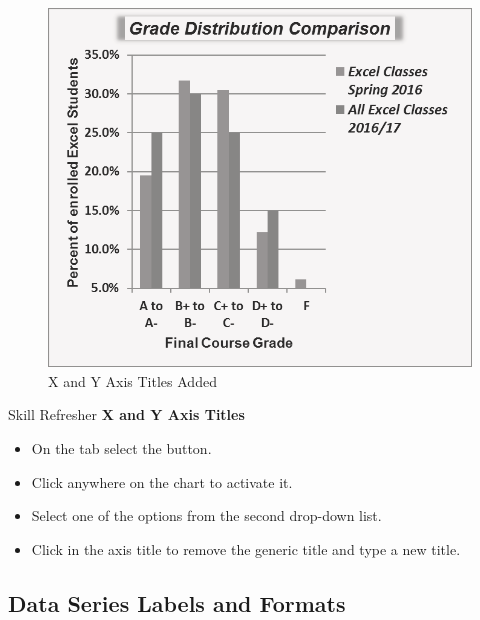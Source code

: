 \begin{figure}[H]
	\centering
	\includegraphics[width=\maxwidth{.95\linewidth}]{gfx/ch04_fig35}
	\caption{X and Y Axis Titles Added}
	\label{04:fig35}
\end{figure}

\begin{center}
	\begin{sklbox}{Skill Refresher}
		\textbf{X and Y Axis Titles}
		\\
		\begin{itemize}
			\setlength{\itemsep}{0pt}
			\setlength{\parskip}{0pt}
			\setlength{\parsep}{0pt}

			\item On the  tab select the  button.
			\item Click anywhere on the chart to activate it.
			\item Select one of the options from the second drop-down list.
			\item Click in the axis title to remove the generic title and type a new title.
			
		\end{itemize}
	\end{sklbox}
\end{center}

\subsection{Data Series Labels and Formats}

